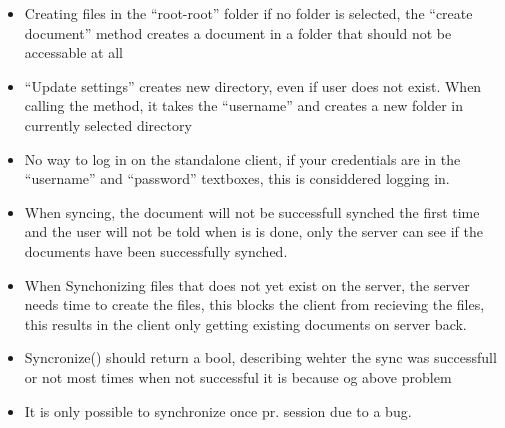 \documentclass[11pt]{article}
\begin{document}
\begin{itemize}
\item Creating files in the ``root-root'' folder if no folder is selected, the 
     ``create document'' method creates a document in a folder that should not 
     be accessable at all
\item ``Update settings'' creates new directory, even if user does not exist.
     When calling the method, it takes the ``username'' and creates a new folder 
     in currently selected directory
\item No way to log in on the standalone client, if your credentials are in the 
     ``username'' and ``password'' textboxes, this is considdered logging in.
\item When syncing, the document will not be successfull synched the first time
     and the user will not be told when is is done, only the server can see if the
     documents have been successfully synched.
\item When Synchonizing files that does not yet exist on the server, the server needs time 
     to create the files, this blocks the client from recieving the files, this results in
     the client only getting existing documents on server back.
\item Syncronize() should return a bool, describing wehter the sync was successfull or not
     most times when not successful it is because og above problem
\item It is only possible to synchronize once pr. session due to a bug.
\end{itemize}
\end{document}
